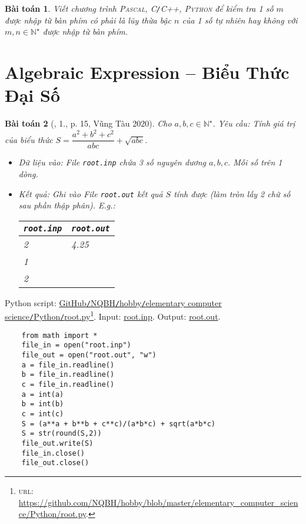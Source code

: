 \documentclass{article}
\newtheorem{baitoan}{Bài toán}
\begin{document}
\begin{baitoan}
	Viết chương trình \textsc{Pascal, C\texttt{/}C++, Python} để kiểm tra 1 số $m$ được nhập từ bàn phím có phải là lũy thừa bậc $n$ của 1 số tự nhiên hay không với $m,n\in\mathbb{N}^\star$ được nhập từ bàn phím.
\end{baitoan}


\section{Algebraic Expression -- Biểu Thức Đại Số}

\begin{baitoan}[\cite{VietSTEM2021}, 1., p. 15, Vũng Tàu 2020]
	Cho $a,b,c\in\mathbb{N}^\star$. {\sf Yêu cầu:} Tính giá trị của biểu thức $S = \dfrac{a^2 + b^2 + c^2}{abc} + \sqrt{abc}$.
	\begin{itemize}
		\item {\sf Dữ liệu vào:} File \verb|root.inp| chứa 3 số nguyên dương $a,b,c$. Mỗi số trên 1 dòng.
		\item {\sf Kết quả:} Ghi vào File \verb|root.out| kết quả $S$ tính được (làm tròn lấy 2 chữ số sau phần thập phân). E.g.:
		\begin{table}[H]
			\centering
			\begin{tabular}{|l|l|}
				\hline
				\texttt{root.inp} & \texttt{root.out} \\
				\hline
				2 & 4.25 \\
				1 &  \\
				2 &  \\
				\hline
			\end{tabular}
		\end{table}
	\end{itemize}
\end{baitoan}
Python script: \href{https://github.com/NQBH/hobby/blob/master/elementary_computer_science/Python/root.py}{GitHub\texttt{/}NQBH\texttt{/}hobby\texttt{/}elementary computer science\texttt{/}Python\texttt{/}root.py}\footnote{\textsc{url}: \url{https://github.com/NQBH/hobby/blob/master/elementary_computer_science/Python/root.py}.}. Input: \href{https://github.com/NQBH/hobby/blob/master/elementary_computer_science/Python/root.inp}{root.inp}. Output: \href{https://github.com/NQBH/hobby/blob/master/elementary_computer_science/Python/root.out}{root.out}.
\begin{verbatim}
	from math import *
	file_in = open("root.inp")
	file_out = open("root.out", "w")
	a = file_in.readline()
	b = file_in.readline()
	c = file_in.readline()
	a = int(a)
	b = int(b)
	c = int(c)
	S = (a**a + b**b + c**c)/(a*b*c) + sqrt(a*b*c)
	S = str(round(S,2))
	file_out.write(S)
	file_in.close()
	file_out.close()
\end{verbatim}
\end{document}
